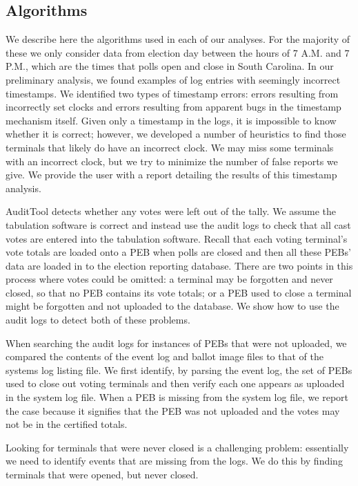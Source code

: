 \documentclass[letterpaper,twocolumn,10pt]{article}
\begin{document}
\subsection{Algorithms}
We describe here the algorithms used in each of our analyses. For the
majority of these we only consider data from election day between the hours of
7 A.M. and 7 P.M., which are the times that polls open and close in South
Carolina. In our preliminary analysis, we found examples of log entries with
seemingly incorrect timestamps. We identified two types of timestamp errors:
errors resulting from incorrectly set clocks and errors resulting from apparent
bugs in the timestamp mechanism itself. Given only a timestamp in the logs, it
is impossible to know whether it is correct; however, we developed a number of
heuristics to find those terminals that likely do have an incorrect clock. We
may miss some terminals with an incorrect clock, but we try to minimize the
number of false reports we give. We provide the user with a report detailing the
results of this timestamp analysis.  

AuditTool detects whether any votes were left out of the tally. We assume the
tabulation software is correct and instead use the audit logs to check that all
cast votes are entered into the tabulation software. Recall that each voting
terminal's vote totals are loaded onto a PEB when polls are closed and then all
these PEBs' data are loaded in to the election reporting database. There are two
points in this process where votes could be omitted: a terminal may be forgotten
and never closed, so that no PEB contains its vote totals; or a PEB used to
close a terminal might be forgotten and not uploaded to the database. We show
how to use the audit logs to detect both of these problems.  

When searching the audit logs for instances of PEBs that were not uploaded, we
compared the contents of the event log and ballot image files to that of the
systems log listing file. We first identify, by parsing the event log, the set
of PEBs used to close out voting terminals and then verify each one appears as
uploaded in the system log file. When a PEB is missing from the system log file,
we report the case because it signifies that the PEB was not uploaded and the
votes may not be in the certified totals.  

Looking for terminals that were never closed is a challenging problem:
essentially we need to identify events that are missing from the logs. We do
this by finding terminals that were opened, but never closed.  
\end{document}
